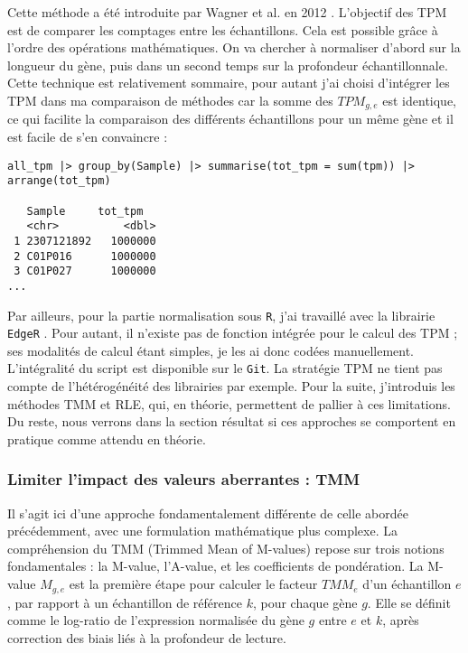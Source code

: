 Cette méthode a été introduite par Wagner et al. en 2012 \textsuperscript{\cite{wagner_TPM_2012}}. L'objectif des TPM est de comparer les comptages entre les échantillons. Cela est possible grâce à l'ordre des opérations mathématiques. On va chercher à normaliser d'abord sur la longueur du gène, puis dans un second temps sur la profondeur échantillonnale. Cette technique est relativement sommaire, pour autant j'ai choisi d'intégrer les TPM dans ma comparaison de méthodes car la somme des \({TPM}_{g,e}\) est identique, ce qui facilite la comparaison des différents échantillons pour un même gène et il est facile de s'en convaincre :

\begin{lstlisting}[style=rStyle, label={lst:TPMequals}, caption={\underline{Vérification de l’égalité des TPM par échantillon}}]
all_tpm |> group_by(Sample) |> summarise(tot_tpm = sum(tpm)) |> arrange(tot_tpm)

   Sample     tot_tpm
   <chr>          <dbl>
 1 2307121892   1000000
 2 C01P016      1000000
 3 C01P027      1000000
...
\end{lstlisting}
Par ailleurs, pour la partie normalisation sous \texttt{R}, j’ai travaillé avec la librairie \texttt{EdgeR} \textsuperscript{\cite{EdgeR_2024}}. Pour autant, il n’existe pas de fonction intégrée pour le calcul des TPM ; ses modalités de calcul étant simples, je les ai donc codées manuellement. L’intégralité du script est disponible sur le \texttt{Git}. La stratégie TPM ne tient pas compte de l’hétérogénéité des librairies par exemple. Pour la suite, j’introduis les méthodes TMM et RLE, qui, en théorie, permettent de pallier à ces limitations. Du reste,  nous verrons dans la section résultat si ces approches se comportent en pratique comme attendu en théorie. 

\subsubsection{Limiter l'impact des valeurs aberrantes : TMM}

Il s'agit ici d'une approche fondamentalement différente de celle abordée précédemment, avec une formulation mathématique plus complexe. La compréhension du TMM (Trimmed Mean of M-values) repose sur trois notions fondamentales : la M-value, l’A-value, et les coefficients de pondération. La M-value \(M_{g,e}\) est la première étape pour calculer le facteur \(TMM_e\) d’un échantillon \(e\), par rapport à un échantillon de référence \(k\), pour chaque gène \(g\). Elle se définit comme le log-ratio de l’expression normalisée du gène \(g\) entre \(e\) et \(k\), après correction des biais liés à la profondeur de lecture.

